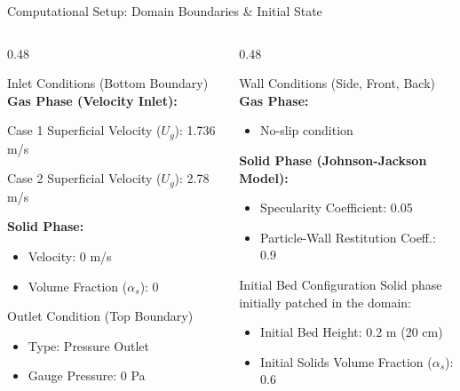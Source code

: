 \documentclass[aspectratio=169]{beamer} %
\newcommand{\bi}{\begin{itemize}}
\newcommand{\ei}{\end{itemize}}
\newcommand{\im}{\item}
\begin{document}
\begin{frame}{Computational Setup: Domain Boundaries & Initial State}
    \begin{columns}[T]
        \begin{column}{0.48\textwidth}
            \begin{block}{Inlet Conditions (Bottom Boundary)}
                \textbf{Gas Phase (Velocity Inlet):}
                \bi
                    {\footnotesize \im Case 1 Superficial Velocity ($U_g$): 1.736 m/s
                    \im Case 2 Superficial Velocity ($U_g$): 2.78 m/s}
                \ei
                \vspace{0.3em}
                \textbf{Solid Phase:}
                \bi
                    \im Velocity: 0 m/s
                    \im Volume Fraction ($\alpha_s$): 0
                \ei
            \end{block}
            \begin{block}{Outlet Condition (Top Boundary)}
                \bi
                    \im Type: Pressure Outlet
                    \im Gauge Pressure: 0 Pa
                \ei
            \end{block}
        \end{column}
        \begin{column}{0.48\textwidth}
            \begin{block}{Wall Conditions (Side, Front, Back)}
                \textbf{Gas Phase:}
                \bi
                    \im No-slip condition
                \ei
                \vspace{0.3em}
                \textbf{Solid Phase (Johnson-Jackson Model):}
                \bi
                    \im Specularity Coefficient: 0.05
                    \im Particle-Wall Restitution Coeff.: 0.9
                \ei
            \end{block}
            \begin{block}{Initial Bed Configuration}
                Solid phase initially patched in the domain:
                \bi
                    \im Initial Bed Height: 0.2 m (20 cm)
                    \im Initial Solids Volume Fraction ($\alpha_s$): 0.6
                \ei
            \end{block}
        \end{column}
    \end{columns}
\end{frame}
\end{document}
